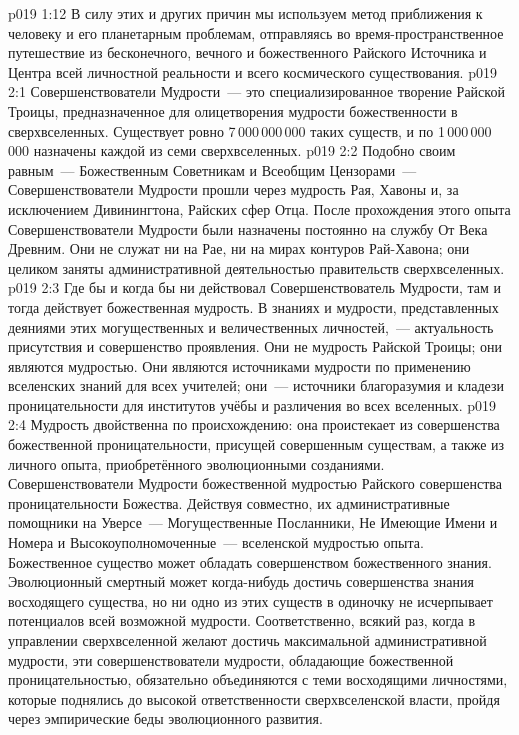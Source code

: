 \vs p019 1:12 \pc В силу этих и других причин мы используем метод приближения к человеку и его планетарным проблемам, отправляясь во время\hyp{}пространственное путешествие из бесконечного, вечного и божественного Райского Источника и Центра всей личностной реальности и всего космического существования.
\vs p019 2:1 Совершенствователи Мудрости~--- это специализированное творение Райской Троицы, предназначенное для олицетворения мудрости божественности в сверхвселенных. Существует ровно 7\,000\,000\,000 таких существ, и по 1\,000\,000\,000 назначены каждой из семи сверхвселенных.
\vs p019 2:2 Подобно своим равным~--- Божественным Советникам и Всеобщим Цензорами~--- Совершенствователи Мудрости прошли через мудрость Рая, Хавоны и, за исключением Дивинингтона, Райских сфер Отца. После прохождения этого опыта Совершенствователи Мудрости были назначены постоянно на службу От Века Древним. Они не служат ни на Рае, ни на мирах контуров Рай\hyp{}Хавона; они целиком заняты административной деятельностью правительств сверхвселенных.
\vs p019 2:3 \pc Где бы и когда бы ни действовал Совершенствователь Мудрости, там и тогда действует божественная мудрость. В знаниях и мудрости, представленных деяниями этих могущественных и величественных личностей,~--- актуальность присутствия и совершенство проявления. Они не  мудрость Райской Троицы; они являются  мудростью. Они являются источниками мудрости по применению вселенских знаний для всех учителей; они~--- источники благоразумия и кладези проницательности для институтов учёбы и различения во всех вселенных.
\vs p019 2:4 Мудрость двойственна по происхождению: она проистекает из совершенства божественной проницательности, присущей совершенным существам, а также из личного опыта, приобретённого эволюционными созданиями. Совершенствователи Мудрости  божественной мудростью Райского совершенства проницательности Божества. Действуя совместно, их административные помощники на Уверсе~--- Могущественные Посланники, Не Имеющие Имени и Номера и Высокоуполномоченные~---  вселенской мудростью опыта. Божественное существо может обладать совершенством божественного знания. Эволюционный смертный может когда\hyp{}нибудь достичь совершенства знания восходящего существа, но ни одно из этих существ в одиночку не исчерпывает потенциалов всей возможной мудрости. Соответственно, всякий раз, когда в управлении сверхвселенной желают достичь максимальной административной мудрости, эти совершенствователи мудрости, обладающие божественной проницательностью, обязательно объединяются с теми восходящими личностями, которые поднялись до высокой ответственности сверхвселенской власти, пройдя через эмпирические беды эволюционного развития.
